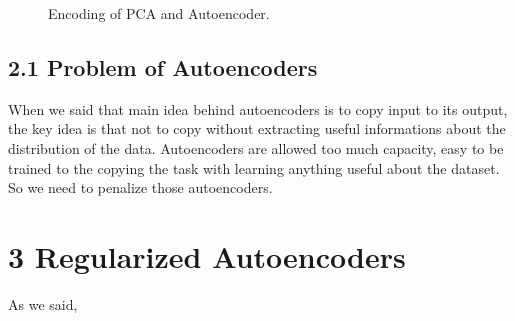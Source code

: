 \documentclass[11pt,twocolumn]{article}
\begin{document}
\begin{figure}
\centering
{}
\caption{Encoding of PCA and Autoencoder.}
\end{figure}
\subsection{2.1 Problem of Autoencoders}
When we said that main idea behind autoencoders is to copy input to its output, the key idea is that not to copy without extracting useful informations about the distribution of the data. Autoencoders are allowed too much capacity, easy to be trained to the copying the task with learning anything useful about the dataset. So we need to penalize those autoencoders.

\section{3 Regularized Autoencoders}
As we said, 
\end{document}
